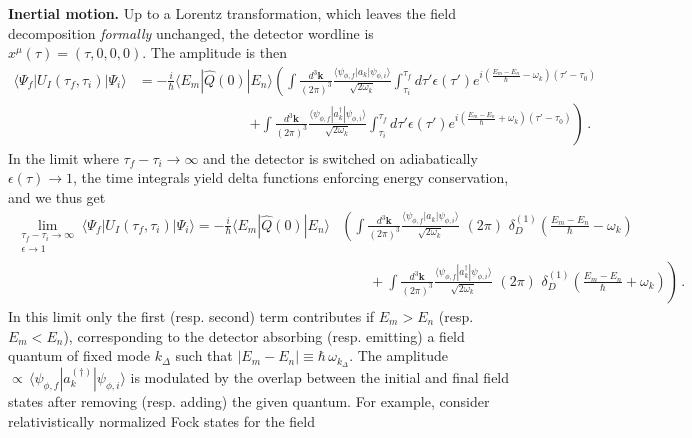 \documentclass[../QFT_main.tex]{subfiles}
\begin{document}
\begin{mytheorem}
\noindent
\textbf{Inertial motion.}
Up to a Lorentz transformation, which leaves the field decomposition \emph{formally} unchanged, the detector wordline is $x^\mu(\tau) = (\tau,0,0,0)$.
The amplitude is then
\begin{align}
    \langle\Psi_f | U_I(\tau_f,\tau_i) | \Psi_i\rangle 
    &=
    - \frac{i}{\hbar}\langle E_m | \hat{Q}(0) | E_n \rangle \left(\int \frac{d^3\mathbf{k}}{(2\pi)^3} \frac{\langle \psi_{\phi,f} | a_k| \psi_{\phi,i}\rangle}{\sqrt{2\omega_k}}  \int_{\tau_i}^{\tau_f}\!\! d\tau' \epsilon(\tau') e^{i \left(\frac{E_m-E_n}{\hbar} -\omega_k \right) (\tau'-\tau_0)} \right.\\
    &\qquad\qquad \qquad\qquad\left. +\int \frac{d^3\mathbf{k}}{(2\pi)^3} \frac{\langle \psi_{\phi,f} | a^\dagger_k| \psi_{\phi,i}\rangle}{\sqrt{2\omega_k}} \int_{\tau_i}^{\tau_f}\!\! d\tau' \epsilon(\tau') e^{i \left(\frac{E_m-E_n}{\hbar} +\omega_k \right) (\tau'-\tau_0)}\right)\,.
\end{align}
In the limit where $\tau_f-\tau_i \to \infty$ and the detector is switched on adiabatically $\epsilon(\tau)\to 1$, the time integrals yield delta functions enforcing energy conservation, and we thus get
{\small
\begin{align}
    \lim_{\substack{\tau_f-\tau_i \to \infty \\ \epsilon\to 1}} \langle\Psi_f | U_I(\tau_f,\tau_i) | \Psi_i\rangle =
    - \frac{i}{\hbar}\langle E_m | \hat{Q}(0) | E_n \rangle &\left(\int \frac{d^3\mathbf{k}}{(2\pi)^3}  \frac{\langle \psi_{\phi,f} | a_k| \psi_{\phi,i}\rangle}{\sqrt{2\omega_k}}\,\, (2\pi)\,\,\delta_D^{(1)}\!\left(\tfrac{E_m-E_n}{\hbar} -\omega_k\right)\right.\\
    &\left.\qquad + \int \frac{d^3\mathbf{k}}{(2\pi)^3} \frac{\langle \psi_{\phi,f} | a^\dagger_k| \psi_{\phi,i}\rangle}{\sqrt{2\omega_k}}\,\, (2\pi)\,\,\delta_D^{(1)}\!\left(\tfrac{E_m-E_n}{\hbar} +\omega_k\right)\right)\,.
\end{align}
}
In this limit only the first (resp. second) term contributes if $E_m > E_n$ (resp. $E_m < E_n$), corresponding to the detector absorbing (resp. emitting) a field quantum of fixed mode $k_\Delta$ such that $ |E_m - E_n| \equiv \hbar\,  \omega_{k_\Delta}$.
The amplitude $\propto\, \langle \psi_{\phi,f} | a_k^{(\dagger)}| \psi_{\phi,i}\rangle$ is modulated by the overlap between the initial and final field states after removing (resp. adding) the given quantum.
For example, consider relativistically normalized Fock states for the field 
\begin{align}

\end{align}
\end{mytheorem}
\end{document}
